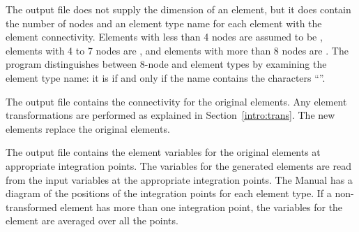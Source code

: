 The  output file does not supply the dimension of an
element, but it does contain the  number of nodes and an element type
name for each element with the element connectivity. Elements with less
than 4 nodes are assumed to be , elements with 4 to 7 nodes are
, and elements with more than 8 nodes are . The
program distinguishes between 8-node  and  element
types by examining the element type name: it is  if and only if
the name contains the characters ``''. 

The  output file contains the connectivity for
the original elements.
Any element transformations are performed as explained in 
Section~\ref{intro:trans}.
The new elements replace the original
elements. 

The  output file contains the element variables 
for the original elements at appropriate integration points.
The variables for the
generated elements are read from the input variables at the appropriate
integration points. The  Manual has a diagram of the
positions of the integration points for each element type. If a
non-transformed element has more than one integration point, the
variables for the element are averaged over all the points.
